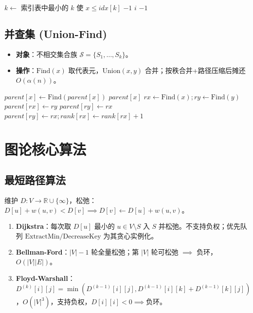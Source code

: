 \begin{algorithm}[H]
\caption{分块查找规约}
\begin{algorithmic}[1]
    \State $k\gets$ 索引表中最小的 $k$ 使 $x\le idx[k]$ 
     \Return $-1$ \EndIf
     
         \Return $i$ \EndIf
    \EndFor
    \State \Return $-1$
\EndProcedure
\end{algorithmic}
\end{algorithm}

\subsection{并查集 (Union-Find)}
\begin{itemize}
    \item \textbf{对象}：不相交集合族 $\mathcal{S}=\{S_1,\dots,S_k\}$。
    \item \textbf{操作}：$\text{Find}(x)$ 取代表元，$\text{Union}(x,y)$ 合并；按秩合并+路径压缩后摊还 $O(\alpha(n))$。
\end{itemize}

\begin{algorithm}[H]
\caption{并查集规约（路径压缩+按秩合并）}
\begin{algorithmic}[1]
     $parent[x]\gets\text{Find}(parent[x])$ \EndIf
    \State \Return $parent[x]$
\EndProcedure
{}
    \State $rx\gets\text{Find}(x); ry\gets\text{Find}(y)$
     \Return \EndIf
     $parent[rx]\gets ry$
     $parent[ry]\gets rx$
    \Else $parent[ry]\gets rx; rank[rx]\gets rank[rx]+1$ \EndIf
\EndProcedure
\end{algorithmic}
\end{algorithm}

\newpage

\section{图论核心算法}

\subsection{最短路径算法}
维护 $D:V\to\mathbb{R}\cup\{\infty\}$，松弛：$D[u]+w(u,v)<D[v]\implies D[v]\gets D[u]+w(u,v)$。

\begin{enumerate}
    \item \textbf{Dijkstra}：每次取 $D[u]$ 最小的 $u\in V\setminus S$ 入 $S$ 并松弛。不支持负权；优先队列 $\text{ExtractMin}/\text{DecreaseKey}$ 为其贪心实例化。
    \item \textbf{Bellman-Ford}：$|V|-1$ 轮全量松弛；第 $|V|$ 轮可松弛 $\implies$ 负环，$O(|V||E|)$。
    \item \textbf{Floyd-Warshall}：$D^{(k)}[i][j]=\min(D^{(k-1)}[i][j],D^{(k-1)}[i][k]+D^{(k-1)}[k][j])$，$O(|V|^3)$，支持负权，$D[i][i]<0\implies$负环。
\end{enumerate}

